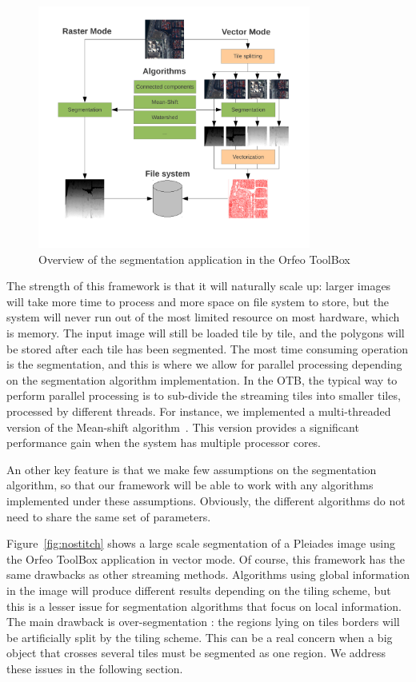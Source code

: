 \documentclass{josis}
\begin{document}
\begin{figure}[!htb]
\centering
\includegraphics[width=0.8\textwidth]{Pictures/schema_ogrs}
\caption{Overview of the segmentation application in the Orfeo ToolBox}\label{fig:framework}
\end{figure} 

The strength of this framework is that it will naturally scale up:
larger images will take more time to process and more space on file
system to store, but the system will never run out of the most limited
resource on most hardware, which is memory. The input image will still
be loaded tile by tile, and the polygons will be stored after each
tile has been segmented. The most time consuming operation is the
segmentation, and this is where we allow for parallel processing
depending on the segmentation algorithm implementation. In the OTB,
the typical way to perform parallel processing is to sub-divide the
streaming tiles into smaller tiles, processed by different
threads. For instance, we implemented a multi-threaded version of the
Mean-shift algorithm~\cite{comaniciu2002mean}. This version provides a
significant performance gain when the system has multiple processor
cores.

An other key feature is that we make few assumptions on the
segmentation algorithm, so that our framework will be able to work
with any algorithms implemented under these assumptions. Obviously,
the different algorithms do not need to share the same set of
parameters.

Figure~\ref{fig:nostitch} shows a large scale segmentation of a
Pleiades image using the Orfeo ToolBox application in vector mode. Of
course, this framework has the same drawbacks as other streaming
methods. Algorithms using global information in the image will produce
different results depending on the tiling scheme, but this is a lesser
issue for segmentation algorithms that focus on local information. The
main drawback is over-segmentation : the regions lying on tiles
borders will be artificially split by the tiling scheme. This can be a
real concern when a big object that crosses several tiles must be
segmented as one region. We address these issues in the following
section.
\end{document}
